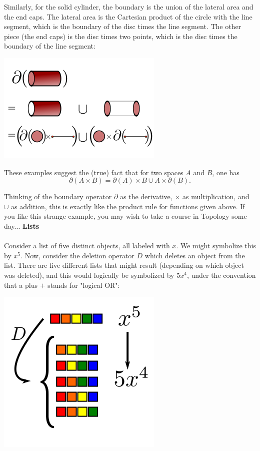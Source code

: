 \documentclass[twoside,openright,titlepage,a4paper]{book}
\begin{document}
\begin{sloppypar}
Similarly, for the solid cylinder, the boundary is the union of the lateral area and the end caps. The lateral area is the Cartesian product of the circle with the line segment, which is the boundary of the disc times the line segment. The other piece (the end caps) is the disc times two points, which is the disc times the boundary of the line segment:
\begin{center}\includegraphics[scale=0.6]{BoundaryProductCylinder}\end{center}

These examples suggest the (true) fact that for two spaces $A$ and $B$, one has \[ \partial(A \times B) = \partial(A) \times B \cup A \times \partial(B). \]

Thinking of the boundary operator $\partial$ as the derivative, $\times$ as multiplication, and $\cup$ as addition, this is exactly like the product rule for functions given above. If you like this strange example, you may wish to take a course in Topology some day...
\bigbreak
\textbf{Lists}\\\\

Consider a list of five distinct objects, all labeled with $x$. We might symbolize this by $x^5$. Now, consider the deletion operator $D$ which deletes an object from the list. There are five different lists that might result (depending on which object was deleted), and this would logically be symbolized by $5x^4$, under the convention that a plus $+$ stands for "logical OR":
\begin{center}\includegraphics[scale=0.6]{ListDelete}\end{center}


\end{sloppypar}
\end{document}
